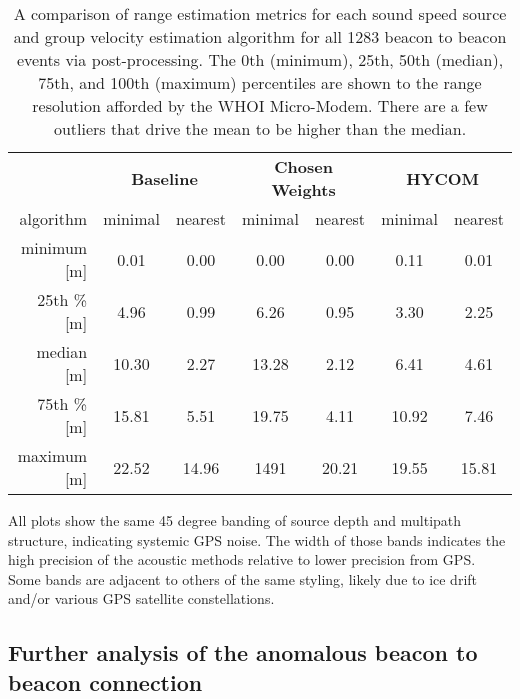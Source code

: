 \begin{table}[h!]
\renewcommand{\arraystretch}{1.5}
\centering
\begin{tabular}{r|cc|cc|cc}\toprule
 & \multicolumn{2}{c|}{\textbf{Baseline} } & \multicolumn{2}{c|}{\textbf{Chosen Weights} } & \multicolumn{2}{c}{\textbf{HYCOM}} \\
 algorithm & \cellcolor[HTML]{EFEFEF}minimal & nearest & \cellcolor[HTML]{EFEFEF} minimal& nearest & \cellcolor[HTML]{EFEFEF}minimal & nearest \\ \hline
 minimum [m] 	& \cellcolor[HTML]{EFEFEF}0.01 & 0.00	& \cellcolor[HTML]{EFEFEF}0.00 	& 0.00 	& \cellcolor[HTML]{EFEFEF}0.11 & 0.01 \\
 25th \% [m]   & \cellcolor[HTML]{EFEFEF}4.96 & 0.99	& \cellcolor[HTML]{EFEFEF}6.26 	& 0.95 	& \cellcolor[HTML]{EFEFEF}3.30 & 2.25 \\   
 median [m]		& \cellcolor[HTML]{EFEFEF}10.30 & 2.27 	& \cellcolor[HTML]{EFEFEF}13.28 & 2.12 	& \cellcolor[HTML]{EFEFEF}6.41 & 4.61 \\
 75th \% [m]   & \cellcolor[HTML]{EFEFEF}15.81 & 5.51 	& \cellcolor[HTML]{EFEFEF}19.75 & 4.11 	& \cellcolor[HTML]{EFEFEF}10.92 & 7.46 \\
 maximum [m]    & \cellcolor[HTML]{EFEFEF}22.52 & 14.96 & \cellcolor[HTML]{EFEFEF}1491  & 20.21 & \cellcolor[HTML]{EFEFEF}19.55 & 15.81 \\
 \toprule
\end{tabular}
\caption[Comparison of post-processing range estimation algorithms across all events]{A comparison of range estimation metrics for each sound speed source and group velocity estimation algorithm for all 1283 beacon to beacon events via post-processing. The 0th (minimum), 25th, 50th (median), 75th, and 100th (maximum) percentiles are shown to the range resolution afforded by the WHOI Micro-Modem. There are a few outliers that drive the mean to be higher than the median.}
\label{tab:rangeErrorV1V2}
\end{table}

All plots show the same 45 degree banding of source depth and multipath structure, indicating systemic GPS noise.
The width of those bands indicates the high precision of the acoustic methods relative to lower precision from GPS.
Some bands are adjacent to others of the same styling, likely due to ice drift and/or various GPS satellite constellations.

\FloatBarrier
\subsection{Further analysis of the anomalous beacon to beacon connection}
\label{subsec:anomalousBeacon}

